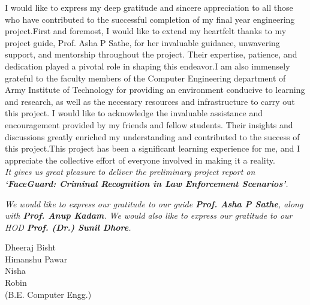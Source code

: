 
I would like to express my deep gratitude and sincere appreciation to all those who have contributed to the successful completion of my final year engineering project.First and foremost, I would like to extend my heartfelt thanks to my project guide, Prof. Asha P Sathe, for her invaluable guidance, unwavering support, and mentorship throughout the project. Their expertise, patience, and dedication played a pivotal role in shaping this endeavor.I am also immensely grateful to the faculty members of the Computer Engineering department of Army Institute of Technology for providing an environment conducive to learning and research, as well as the necessary resources and infrastructure to carry out this project. I would like to acknowledge the invaluable assistance and encouragement provided by my friends and fellow students. Their insights and discussions greatly enriched my understanding and contributed to the success of this project.This project has been a significant learning experience for me, and I appreciate the collective effort of everyone involved in making it a reality.\\
\textit{It gives us great pleasure to deliver the preliminary project report on \textbf{`FaceGuard: Criminal Recognition in Law Enforcement Scenarios'}.}

\textit{We would like to express our gratitude to our guide \textbf{Prof. Asha P Sathe}, along with \textbf{Prof. Anup Kadam}. We would also like to express our gratitude to our HOD \textbf{Prof. (Dr.) Sunil Dhore}.}

\vspace*{\baselineskip}

\begin{flushright}
	Dheeraj Bisht \\
	Himanshu Pawar \\
	Nisha \\
	Robin \\
	\vspace*{0.5 \baselineskip}
	(B.E. Computer Engg.)
\end{flushright}